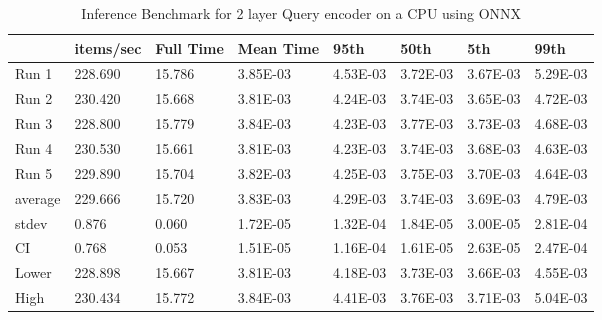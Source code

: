 \begin{table*}[!ht]
    \centering
    \begin{tabular}{|l|l|l|l|l|l|l|l|}
    \hline
        ~ & items/sec & Full Time & Mean Time & 95th & 50th & 5th & 99th \\ \hline
        Run 1 & 228.690 & 15.786 & 3.85E-03 & 4.53E-03 & 3.72E-03 & 3.67E-03 & 5.29E-03 \\ \hline
        Run 2 & 230.420 & 15.668 & 3.81E-03 & 4.24E-03 & 3.74E-03 & 3.65E-03 & 4.72E-03 \\ \hline
        Run 3 & 228.800 & 15.779 & 3.84E-03 & 4.23E-03 & 3.77E-03 & 3.73E-03 & 4.68E-03 \\ \hline
        Run 4 & 230.530 & 15.661 & 3.81E-03 & 4.23E-03 & 3.74E-03 & 3.68E-03 & 4.63E-03 \\ \hline
        Run 5 & 229.890 & 15.704 & 3.82E-03 & 4.25E-03 & 3.75E-03 & 3.70E-03 & 4.64E-03 \\ \hline
        average & 229.666 & 15.720 & 3.83E-03 & 4.29E-03 & 3.74E-03 & 3.69E-03 & 4.79E-03 \\ \hline
        stdev & 0.876 & 0.060 & 1.72E-05 & 1.32E-04 & 1.84E-05 & 3.00E-05 & 2.81E-04 \\ \hline
        CI & 0.768 & 0.053 & 1.51E-05 & 1.16E-04 & 1.61E-05 & 2.63E-05 & 2.47E-04 \\ \hline
        Lower & 228.898 & 15.667 & 3.81E-03 & 4.18E-03 & 3.73E-03 & 3.66E-03 & 4.55E-03 \\ \hline
        High & 230.434 & 15.772 & 3.84E-03 & 4.41E-03 & 3.76E-03 & 3.71E-03 & 5.04E-03 \\ \hline
    \end{tabular}
    \caption{Inference Benchmark for 2 layer Query encoder on a CPU using ONNX}
    \label{tab:benchmark-cpu-2layer}
\end{table*}

